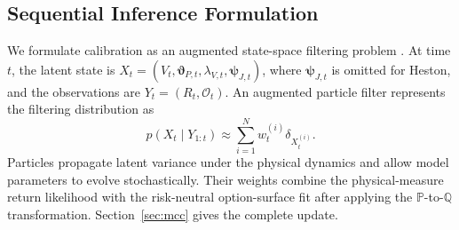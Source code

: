 \documentclass[sigconf,anonymous,review]{acmart}
\begin{document}
\subsection{Sequential Inference Formulation}

We formulate calibration as an augmented state-space filtering problem
\cite{gordon1993bootstrap,kitagawa1996monte}. At time \(t\), the latent
state is
\(
X_t=(V_t,\boldsymbol{\vartheta}_{P,t},
\lambda_{V,t},\boldsymbol{\psi}_{J,t})
\),
where \(\boldsymbol{\psi}_{J,t}\) is omitted for Heston, and the
observations are \(Y_t=(R_t,\mathcal O_t)\). An augmented particle
filter represents the filtering distribution as
\begin{equation}
p(X_t\mid Y_{1:t})
\approx
\sum_{i=1}^{N} w_t^{(i)}\delta_{X_t^{(i)}}.
\end{equation}
Particles propagate latent variance under the physical dynamics and
allow model parameters to evolve stochastically. Their weights combine
the physical-measure return likelihood with the risk-neutral
option-surface fit after applying the \(\mathbb P\)-to-\(\mathbb Q\)
transformation. Section~\ref{sec:mcc} gives the complete update.


\end{document}
